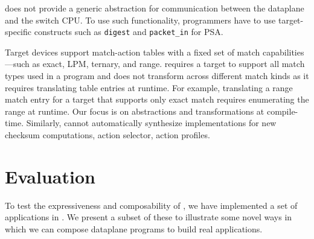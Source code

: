 \documentclass[letterpaper,twocolumn,10pt]{article}
\begin{document}
\uarch does not provide a generic abstraction for communication
between the dataplane and the switch CPU. To use such functionality,
programmers have to use target-specific constructs such as
\texttt{digest} and \texttt{packet\_in} for PSA.

Target devices support match-action tables with a fixed set of match
capabilities---such as exact, LPM, ternary, and range. \ulang requires
a target to support all match types used in a program and \ucomp does
not transform across different match kinds as it requires translating
table entries at runtime. For example, translating a range match entry
for a target that supports only exact match requires enumerating the
range at runtime.  Our focus is on abstractions and transformations at
compile-time. Similarly, \ulang cannot automatically synthesize
implementations for new checksum computations, action selector, action
profiles.







\section{Evaluation}
\label{sec:evaluation}
To test the expressiveness and composability of \ulang, we have
implemented a set of applications in \ulang. We present a subset of
these to illustrate some novel ways in which  we can compose dataplane
programs to build real applications.
\end{document}
